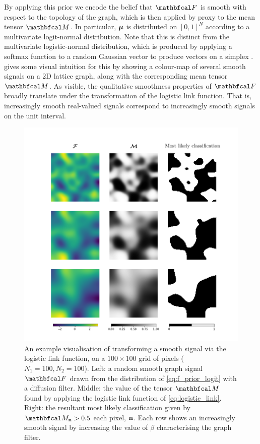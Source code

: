 By applying this prior we encode the belief that $\Ft$ is smooth with respect to the topology of the graph, which is then applied by proxy to the mean tensor $\Mt$. In particular, $\boldsymbol{\mu}$ is distributed on $[0, 1]^N$ according to a multivariate logit-normal distribution. Note that this is distinct from the multivariate logistic-normal distribution, which is produced by applying a softmax function to a random Gaussian vector to produce vectors on a simplex \citep{Atchinson1980}.  gives some visual intuition for this by showing a colour-map of several smooth signals on a 2D lattice graph, along with the corresponding mean tensor $\Mt$. As visible, the qualitative smoothness properties of $\Ft$ broadly translate under the transformation of the logistic link function. That is, increasingly smooth real-valued signals correspond to increasingly smooth signals on the unit interval. 

\begin{figure}[t] 
    \begin{center}
        \includegraphics[width=0.9
        \linewidth]{Figures/logistic_gsr.pdf}
    \end{center}
    \caption[Visualisation of binary classification on a 2D lattice]{An example visualisation of transforming a smooth signal via the logistic link function, on a $100 \times 100$ grid of pixels ($N_1 = 100, N_2 = 100$). Left: a random smooth graph signal $\Ft$ drawn from the distribution of \cref{eq:f_prior_logit} with a diffusion filter. Middle: the value of the tensor $\Mt$ found by applying the logistic link function of \cref{eq:logistic_link}. Right: the resultant most likely classification given by $\Mt_{\nn} > 0.5$ each pixel, $\mathbf{n}$. Each row shows an increasingly smooth signal by increasing the value of $\beta$ characterising the graph filter. } 
    \label{fig:logistic_gsr}
\end{figure} 

